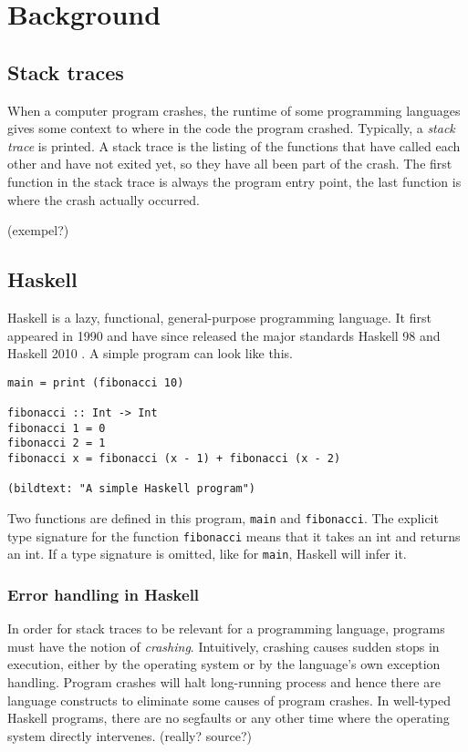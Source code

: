 \section{Background}

\subsection{Stack traces}

When a computer program crashes, the runtime of some programming languages
gives some context to where in the code the program crashed.
Typically, a \emph{stack trace} is printed. A stack trace is the listing
of the functions that have called each other and have not exited yet, so
they have all been part of the crash. The first function in the stack
trace is always the program entry point, the last function is where the
crash actually occurred.

(exempel?)

\subsection{Haskell}

Haskell is a lazy, functional, general-purpose programming language.
\cite{haskell_report2010}
It first appeared in 1990 \cite{HistoryOfHaskell2007}  and have since
released the major standards Haskell 98 and Haskell 2010
\cite{haskell_report2010} . A simple program can look like this.

\begin{verbatim}
main = print (fibonacci 10)

fibonacci :: Int -> Int
fibonacci 1 = 0
fibonacci 2 = 1
fibonacci x = fibonacci (x - 1) + fibonacci (x - 2)

(bildtext: "A simple Haskell program")
\end{verbatim}


Two functions are defined in this program, \texttt{main} and
\texttt{fibonacci}.  The explicit type signature for the function
\texttt{fibonacci} means that it takes an int and returns an int. If a type
signature is omitted, like for \texttt{main}, Haskell will infer it.

\subsubsection{Error handling in Haskell}

In order for stack traces to be relevant for a programming language, programs
must have the notion of \emph{crashing}. Intuitively, crashing causes sudden
stops in execution, either by the operating system or by the language's own
exception handling. Program crashes will halt long-running process and hence
there are language constructs to eliminate some causes of program crashes.
In well-typed Haskell programs, there are no segfaults \cite{FindingTheNeedle2009}  or any other time where the operating system directly intervenes. (really? source?)

